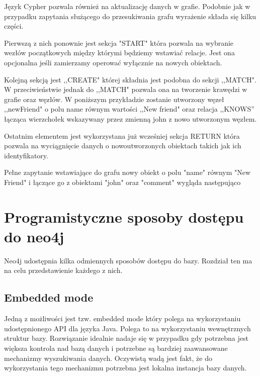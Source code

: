 \documentclass[brudnopis]{xmgr}
\begin{document}
Język Cypher pozwala również na aktualizację danych w grafie. Podobnie jak w przypadku zapytania służącego do przesukiwania grafu wyrażenie składa się kilku części.

Pierwszą z nich ponownie jest sekcja "START" która pozwala na wybranie wezłów początkowych między którymi będziemy wstawiać relacje. Jest ona opcjonalna jeśli zamierzamy operować wyłącznie na nowych obiektach.



Kolejną sekcją jest ,,CREATE" której składnia jest podobna do sekcji ,,MATCH". W przeciwieństwie jednak do ,,MATCH" pozwala ona na tworzenie krawędzi w grafie oraz węzłów. W poniższym przykładzie zostanie utworzony węzeł ,,newFriend" o polu name równym wartości ,,New friend" oraz relacja ,,KNOWS'' łącząca wierzchołek wskazywany przez zmienną john z nowo utworzonym węzłem.



Ostatnim elementem jest wykorzystana już wcześniej sekcja RETURN która pozwala na wyciągnięcie danych o nowoutworzonych obiektach takich jak ich identyfikatory.



Pełne zapytanie wstawiające do grafu nowy obiekt o polu "name" równym "New Friend" i łączące go z obiektami "john" oraz "comment" wygląda następująco



\section{Programistyczne sposoby dostępu do neo4j}

Neo4j udostępnia kilka odmiennych sposobów dostępu do bazy. Rozdział ten ma na celu przedstawienie każdego z nich.

\subsection{Embedded mode}

Jedną z możliwości jest tzw. embedded mode który polega na wykorzystaniu udostępnionego API dla języka Java. Polega to na wykorzystaniu wewnętrznych struktur bazy. Rozwiązanie idealnie nadaje się w przypadku gdy potrzebna jest większa kontrola nad bazą danych i potrzebne są bardziej zaawansowane mechanizmy wyszukiwania danych. Oczywistą wadą jest fakt, że do wykorzystania tego mechanizmu potrzebna jest lokalna instancja bazy danych.
\end{document}
